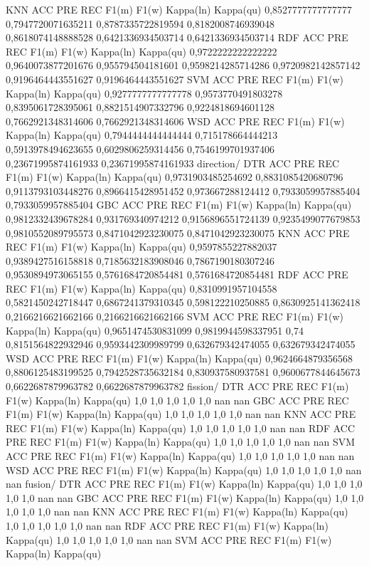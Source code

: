 KNN
ACC	PRE	REC	F1(m)	F1(w)	Kappa(ln)	Kappa(qu)
0,8527777777777777	0,7947720071635211	0,8787335722819594	0,8182008746939048	0,8618074148888528	0,6421336934503714	0,6421336934503714
RDF
ACC	PRE	REC	F1(m)	F1(w)	Kappa(ln)	Kappa(qu)
0,9722222222222222	0,9640073877201676	0,955794504181601	0,9598214285714286	0,9720982142857142	0,9196464443551627	0,9196464443551627
SVM
ACC	PRE	REC	F1(m)	F1(w)	Kappa(ln)	Kappa(qu)
0,9277777777777778	0,9573770491803278	0,8395061728395061	0,8821514907332796	0,9224818694601128	0,7662921348314606	0,7662921348314606
WSD
ACC	PRE	REC	F1(m)	F1(w)	Kappa(ln)	Kappa(qu)
0,7944444444444444	0,715178664444213	0,5913978494623655	0,6029806259314456	0,7546199701937406	0,23671995874161933	0,23671995874161933
direction/
DTR
ACC	PRE	REC	F1(m)	F1(w)	Kappa(ln)	Kappa(qu)
0,9731903485254692	0,8831085420680796	0,9113793103448276	0,8966415428951452	0,973667288124412	0,7933059957885404	0,7933059957885404
GBC
ACC	PRE	REC	F1(m)	F1(w)	Kappa(ln)	Kappa(qu)
0,9812332439678284	0,931769340974212	0,9156896551724139	0,9235499077679853	0,9810552089795573	0,8471042923230075	0,8471042923230075
KNN
ACC	PRE	REC	F1(m)	F1(w)	Kappa(ln)	Kappa(qu)
0,9597855227882037	0,9389427516158818	0,7185632183908046	0,7867190180307246	0,9530894973065155	0,5761684720854481	0,5761684720854481
RDF
ACC	PRE	REC	F1(m)	F1(w)	Kappa(ln)	Kappa(qu)
0,8310991957104558	0,5821450242718447	0,6867241379310345	0,598122210250885	0,8630925141362418	0,2166216621662166	0,2166216621662166
SVM
ACC	PRE	REC	F1(m)	F1(w)	Kappa(ln)	Kappa(qu)
0,9651474530831099	0,9819944598337951	0,74	0,8151564822932946	0,9593442309989799	0,632679342474055	0,632679342474055
WSD
ACC	PRE	REC	F1(m)	F1(w)	Kappa(ln)	Kappa(qu)
0,9624664879356568	0,8806125483199525	0,7942528735632184	0,830937580937581	0,9600677844645673	0,6622687879963782	0,6622687879963782
fission/
DTR
ACC	PRE	REC	F1(m)	F1(w)	Kappa(ln)	Kappa(qu)
1,0	1,0	1,0	1,0	1,0	nan	nan
GBC
ACC	PRE	REC	F1(m)	F1(w)	Kappa(ln)	Kappa(qu)
1,0	1,0	1,0	1,0	1,0	nan	nan
KNN
ACC	PRE	REC	F1(m)	F1(w)	Kappa(ln)	Kappa(qu)
1,0	1,0	1,0	1,0	1,0	nan	nan
RDF
ACC	PRE	REC	F1(m)	F1(w)	Kappa(ln)	Kappa(qu)
1,0	1,0	1,0	1,0	1,0	nan	nan
SVM
ACC	PRE	REC	F1(m)	F1(w)	Kappa(ln)	Kappa(qu)
1,0	1,0	1,0	1,0	1,0	nan	nan
WSD
ACC	PRE	REC	F1(m)	F1(w)	Kappa(ln)	Kappa(qu)
1,0	1,0	1,0	1,0	1,0	nan	nan
fusion/
DTR
ACC	PRE	REC	F1(m)	F1(w)	Kappa(ln)	Kappa(qu)
1,0	1,0	1,0	1,0	1,0	nan	nan
GBC
ACC	PRE	REC	F1(m)	F1(w)	Kappa(ln)	Kappa(qu)
1,0	1,0	1,0	1,0	1,0	nan	nan
KNN
ACC	PRE	REC	F1(m)	F1(w)	Kappa(ln)	Kappa(qu)
1,0	1,0	1,0	1,0	1,0	nan	nan
RDF
ACC	PRE	REC	F1(m)	F1(w)	Kappa(ln)	Kappa(qu)
1,0	1,0	1,0	1,0	1,0	nan	nan
SVM
ACC	PRE	REC	F1(m)	F1(w)	Kappa(ln)	Kappa(qu)
